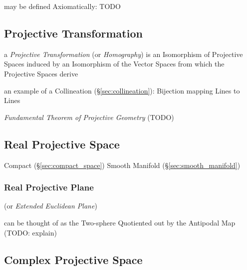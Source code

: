 may be defined Axiomatically: TODO



\subsection{Projective Transformation}\label{sec:projective_transformation}

a \emph{Projective Transformation} (or \emph{Homography}) is an Isomorphism of
Projective Spaces induced by an Isomorphism of the Vector Spaces from which the
Projective Spaces derive

an example of a Collineation (\S\ref{sec:collineation}): Bijection mapping Lines
to Lines

\emph{Fundamental Theorem of Projective Geometry} (TODO)



\subsection{Real Projective Space}\label{sec:real_projective_space}

Compact (\S\ref{sec:compact_space}) Smooth Manifold
(\S\ref{sec:smooth_manifold})



\subsubsection{Real Projective Plane}\label{sec:real_projective_plane}

(or \emph{Extended Euclidean Plane})

can be thought of as the Two-sphere Quotiented out by the Antipodal Map (TODO:
explain)



\subsection{Complex Projective Space}\label{sec:complex_projective_space}

